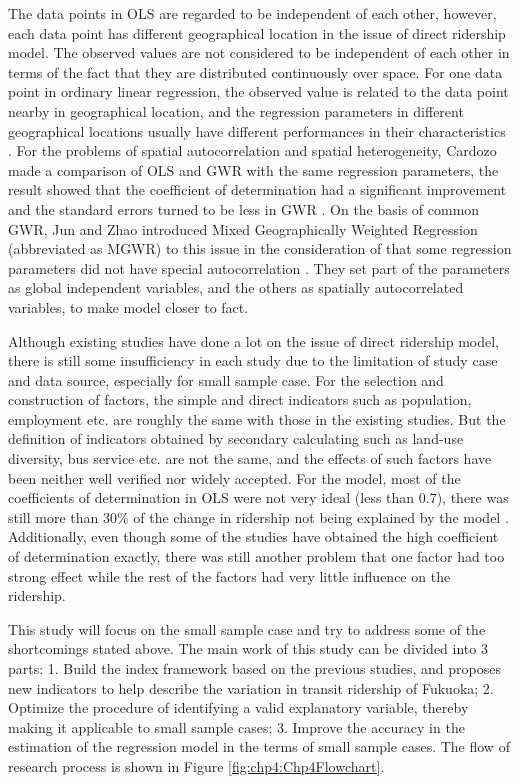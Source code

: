 The data points in OLS are regarded to be independent of each other, however, each data point has different geographical location in the issue of direct ridership model. The observed values are not considered to be independent of each other in terms of the fact that they are distributed continuously over space. For one data point in ordinary linear regression, the observed value is related to the data point nearby in geographical location, and the regression parameters in different geographical locations usually have different performances in their characteristics \cite{brunsdon1996geographically}. For the problems of spatial autocorrelation and spatial heterogeneity, Cardozo made a comparison of OLS and GWR with the same regression parameters, the result showed that the coefficient of determination had a significant improvement and the standard errors turned to be less in GWR \cite{cardozo2012application}. On the basis of common GWR, Jun and Zhao introduced Mixed Geographically Weighted Regression (abbreviated as MGWR) to this issue in the consideration of that some regression parameters did not have special autocorrelation \cite{jun2015land,zhao2005transit}. They set part of the parameters as global independent variables, and the others as spatially autocorrelated variables, to make model closer to fact.

Although existing studies have done a lot on the issue of direct ridership model, there is still some insufficiency in each study due to the limitation of study case and data source, especially for small sample case. For the selection and construction of factors, the simple and direct indicators such as population, employment etc. are roughly the same with those in the existing studies. But the definition of indicators obtained by secondary calculating such as land-use diversity, bus service etc. are not the same, and the effects of such factors have been neither well verified nor widely accepted. For the model, most of the coefficients of determination in OLS were not very ideal (less than 0.7), there was still more than 30\% of the change in ridership not being explained by the model \cite{gutierrez2011transit,jun2015land}. Additionally, even though some of the studies have obtained the high coefficient of determination exactly, there was still another problem that one factor had too strong effect while the rest of the factors had very little influence on the ridership.

This study will focus on the small sample case and try to address some of the shortcomings stated above. The main work of this study can be divided into 3 parts: 1. Build the index framework based on the previous studies, and proposes new indicators to help describe the variation in transit ridership of Fukuoka; 2. Optimize the procedure of identifying a valid explanatory variable, thereby making it applicable to small sample cases; 3. Improve the accuracy in the estimation of the regression model in the terms of small sample cases. The flow of research process is shown in Figure \ref{fig:chp4:Chp4Flowchart}.

